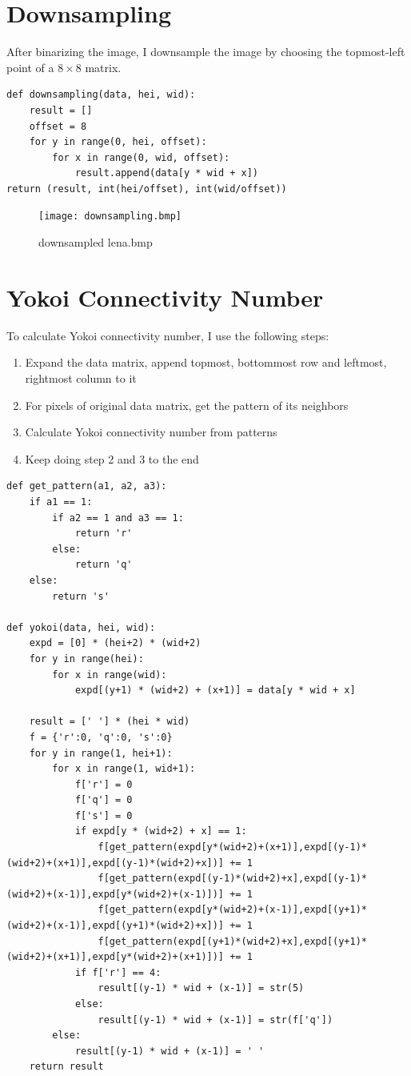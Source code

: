 \documentclass[14pt,a4paper]{extarticle}
\begin{document}
\section*{Downsampling}

After binarizing the image, I downsample the image by choosing the topmost-left point of a $8\times8$ matrix.

\begin{lstlisting}
def downsampling(data, hei, wid):
	result = []
	offset = 8
	for y in range(0, hei, offset):
		for x in range(0, wid, offset):
			result.append(data[y * wid + x])
return (result, int(hei/offset), int(wid/offset))
\end{lstlisting}

\begin{figure}[H]
\centering
\texttt{[image: downsampling.bmp]}
\caption{downsampled lena.bmp}
\label{fig:downsampling.bmp}
\end{figure}

\section*{Yokoi Connectivity Number}

To calculate Yokoi connectivity number, I use the following steps:
\begin{enumerate}
	\item Expand the data matrix, append topmost, bottommost row and leftmost, rightmost column to it
	\item For pixels of original data matrix, get the pattern of its neighbors
	\item Calculate Yokoi connectivity number from patterns
	\item Keep doing step 2 and 3 to the end
\end{enumerate}

\begin{lstlisting}
def get_pattern(a1, a2, a3):
    if a1 == 1:
        if a2 == 1 and a3 == 1:
            return 'r'
        else:
            return 'q'
    else:
        return 's'

def yokoi(data, hei, wid):
	expd = [0] * (hei+2) * (wid+2)
	for y in range(hei):
		for x in range(wid):
			expd[(y+1) * (wid+2) + (x+1)] = data[y * wid + x]

	result = [' '] * (hei * wid)
	f = {'r':0, 'q':0, 's':0}
	for y in range(1, hei+1):
		for x in range(1, wid+1):
			f['r'] = 0
			f['q'] = 0
			f['s'] = 0
			if expd[y * (wid+2) + x] == 1:
				f[get_pattern(expd[y*(wid+2)+(x+1)],expd[(y-1)*(wid+2)+(x+1)],expd[(y-1)*(wid+2)+x])] += 1
				f[get_pattern(expd[(y-1)*(wid+2)+x],expd[(y-1)*(wid+2)+(x-1)],expd[y*(wid+2)+(x-1)])] += 1
				f[get_pattern(expd[y*(wid+2)+(x-1)],expd[(y+1)*(wid+2)+(x-1)],expd[(y+1)*(wid+2)+x])] += 1
				f[get_pattern(expd[(y+1)*(wid+2)+x],expd[(y+1)*(wid+2)+(x+1)],expd[y*(wid+2)+(x+1)])] += 1
			if f['r'] == 4:
				result[(y-1) * wid + (x-1)] = str(5)
			else:
				result[(y-1) * wid + (x-1)] = str(f['q'])
		else:
			result[(y-1) * wid + (x-1)] = ' '
	return result
\end{lstlisting}
\end{document}
